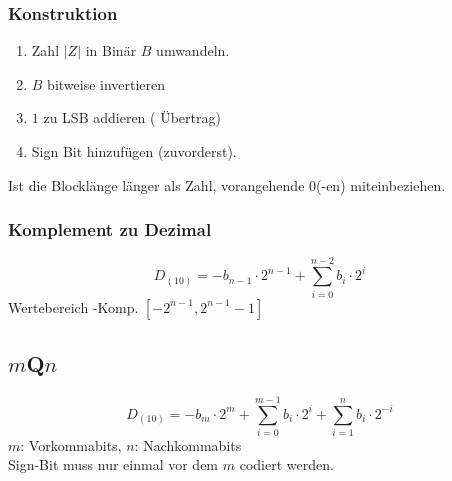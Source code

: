 \subsubsection{Konstruktion}
\begin{enumerate}
    \item Zahl $|Z|$ in Binär $B$ umwandeln.
    \item $B$ bitweise invertieren
    \item $1$ zu LSB addieren (\cemph{!} Übertrag)
    \item Sign Bit hinzufügen (zuvorderst).
\end{enumerate}
Ist die Blocklänge länger als Zahl, vorangehende $0$(-en) miteinbeziehen.
\subsubsection{\twocom Komplement zu Dezimal}
\begin{equation*}
    D_{(10)} = - b_{n-1} \cdot 2^{n-1} + \sum_{i = 0}^{n-2} b_i \cdot 2^i
\end{equation*}
Wertebereich \twocom-Komp. $\left[-2^{n-1}, 2^{n-1} -1\right]$
\subsection{$m$Q$n$}
\begin{equation*}
    D_{(10)} = -b_m \cdot 2^m + \sum_{i = 0}^{m - 1} b_i \cdot 2^i + \sum_{i = 1}^{n} b_i \cdot 2^{-i}
\end{equation*}
$m$: Vorkommabits, $n$: Nachkommabits\\
Sign-Bit muss nur einmal vor dem $m$ codiert werden.

